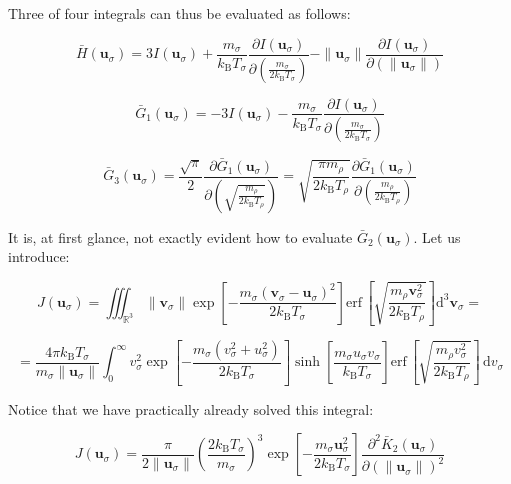 Three of four integrals can thus be evaluated as follows:

\begin{equation}
    \bar{H}(\mathbf{u}_\sigma)=3I(\mathbf{u}_\sigma)+\frac{m_\sigma}{k_\mathrm{B}T_\sigma}\frac{\partial I(\mathbf{u}_\sigma)}{\partial(\frac{m_\sigma}{2k_\mathrm{B}T_\sigma})}-\|\mathbf{u}_\sigma\|\frac{\partial I(\mathbf{u}_\sigma)}{\partial(\|\mathbf{u}_\sigma\|)}
\end{equation}

\begin{equation}
    \bar{G}_1(\mathbf{u}_\sigma)=-3I(\mathbf{u}_\sigma)-\frac{m_\sigma}{k_\mathrm{B}T_\sigma}\frac{\partial I(\mathbf{u}_\sigma)}{\partial\left(\frac{m_\sigma}{2k_\mathrm{B}T_\sigma}\right)}
\end{equation}

\begin{equation}
    \bar{G}_3(\mathbf{u}_\sigma)=\frac{\sqrt{\pi}}{2}\frac{\partial\bar{G}_1(\mathbf{u}_\sigma)}{\partial\left(\sqrt{\frac{m_\rho}{2k_\mathrm{B}T_\rho}}\right)}=\sqrt{\frac{\pi m_\rho}{2k_\mathrm{B}T_\rho}}\frac{\partial\bar{G}_1(\mathbf{u}_\sigma)}{\partial\left(\frac{m_\rho}{2k_\mathrm{B}T_\rho}\right)}
\end{equation}

It is, at first glance, not exactly evident how to evaluate $\bar{G}_2(\mathbf{u}_\sigma)$. Let us introduce:

\begin{equation}
    J(\mathbf{u}_\sigma)=\iiint_{\mathbb{R}^3}\|\mathbf{v}_\sigma\|\exp{\left[-\frac{m_\sigma(\mathbf{v}_\sigma-\mathbf{u}_\sigma)^2}{2k_\mathrm{B}T_\sigma}\right]}\text{erf}\,\left[\sqrt{\frac{m_\rho\mathbf{v}_\sigma^2}{2k_\mathrm{B}T_\rho}}\right]\mathrm{d}^3\mathbf{v}_\sigma=
\end{equation}

\begin{equation}
    =\frac{4\pi k_\mathrm{B}T_\sigma}{m_\sigma\|\mathbf{u}_\sigma\|}\int_{0}^\infty v_\sigma^2\exp{\left[-\frac{m_\sigma(v_\sigma^2+u_\sigma^2)}{2k_\mathrm{B}T_\sigma}\right]}\sinh{\left[\frac{m_\sigma u_\sigma v_\sigma}{k_\mathrm{B}T_\sigma}\right]}\text{erf}\,\left[\sqrt{\frac{m_\rho v_\sigma^2}{2k_\mathrm{B}T_\rho}}\right]\,\mathrm{d}v_\sigma
\end{equation}

Notice that we have practically already solved this integral:

\begin{equation}
    J(\mathbf{u}_\sigma)=\frac{\pi}{2\|\mathbf{u}_\sigma\|}\left(\frac{2k_\mathrm{B}T_\sigma}{m_\sigma}\right)^3\exp{\left[-\frac{m_\sigma\mathbf{u}_\sigma^2}{2k_\mathrm{B}T_\sigma}\right]}\frac{\partial^2\bar{K}_2(\mathbf{u}_\sigma)}{\partial(\|\mathbf{u}_\sigma\|)^2}
\end{equation}

